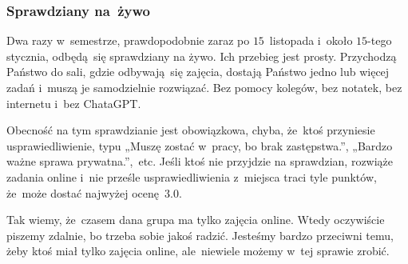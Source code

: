 \documentclass[10pt,t]{beamer}
\begin{document}
\begin{frame}
  \frametitle{Sprawdziany na~żywo}


  Dwa razy w~semestrze, prawdopodobnie zaraz po $15$~listopada
  i~około $15$-tego stycznia, odbędą~się sprawdziany na żywo. Ich przebieg
  jest prosty. Przychodzą Państwo do sali, gdzie odbywają~się zajęcia,
  dostają Państwo jedno lub więcej zadań i~muszą je samodzielnie rozwiązać.
  Bez pomocy kolegów, bez notatek, bez internetu i~bez ChataGPT.

  Obecność na tym sprawdzianie jest \alert{obowiązkowa}, chyba, że~ktoś
  przyniesie usprawiedliwienie, typu „Muszę zostać w~pracy, bo brak
  zastępstwa.”, „Bardzo ważne sprawa prywatna.”,~etc. Jeśli ktoś nie
  przyjdzie na sprawdzian, rozwiąże zadania online i~\alert{nie} prześle
  usprawiedliwienia z~miejsca traci tyle punktów, że~może dostać
  \alert{najwyżej} ocenę~$3.0$.

  Tak wiemy, że~czasem dana grupa \alert{ma tylko zajęcia online}. Wtedy
  oczywiście piszemy zdalnie, bo trzeba sobie jakoś radzić. Jesteśmy bardzo
  przeciwni temu, żeby ktoś miał tylko zajęcia online, ale~niewiele
  możemy w~tej sprawie zrobić.

\end{frame}
\end{document}
